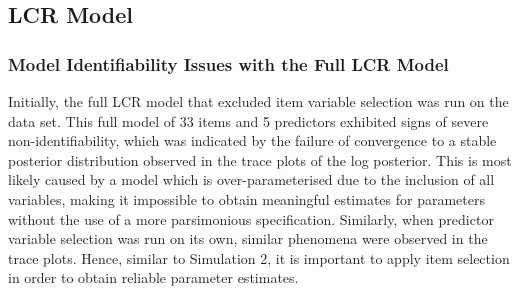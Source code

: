 \documentclass[11pt]{article}
\theoremstyle{plain}
\theoremstyle{definition}
\begin{document}
\subsection{LCR Model}
\subsubsection{Model Identifiability Issues with the Full LCR Model}
Initially, the full LCR model that excluded item variable selection was run on the data set. This full model of 33 items and 5 predictors exhibited signs of severe non-identifiability, which was indicated by the failure of convergence to a stable posterior distribution observed in the trace plots of the log posterior. 
This is most likely caused by a model which is over-parameterised due to the inclusion of all variables, making it impossible to obtain meaningful estimates for parameters without the use of a more parsimonious specification. Similarly, when predictor variable selection was run on its own, similar phenomena were observed in the trace plots. Hence, similar to Simulation 2, it is important to apply item selection in order to obtain reliable parameter estimates.
\end{document}

